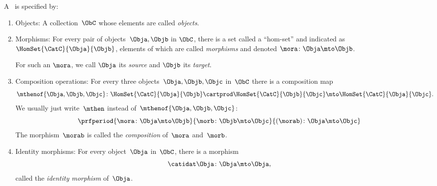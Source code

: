 \begin{ctdefinition}[Category]
    \label{def:categorymain}
    A ~\CatC is specified by:
    \begin{body}
        \constit
        \begin{enumerate}
            \item \label{category-objects}
                  Objects: A collection~$\ObC$ whose elements are called \emph{objects}.
            \item \label{category-morphisms}
                  Morphisms: For every pair of objects~$\Obja,\Objb$ in $\ObC$, there is a set called a ``hom-set'' and indicated as~$\HomSet{\CatC}{\Obja}{\Objb}$, elements of which are called \emph{morphisms} and denoted $\mora \colon \Obja \mto \Objb$.

                  For such an $\mora$, we call $\Obja$ its \emph{source} and $\Objb$ its \emph{target}.
            \item \label{category-composition}
                  Composition operations: For every three objects~$\Obja,\Objb,\Objc$ in~$\ObC$ there is a composition map
                  \begin{equation}\label{eq:category-composition}
                      \mthenof{\Obja,\Objb,\Objc}\colon \HomSet{\CatC}{\Obja}{\Objb} \cartprod \HomSet{\CatC}{\Objb}{\Objc}\mto \HomSet{\CatC}{\Obja}{\Objc}.
                  \end{equation}
                  We usually just write~$\mthen$ instead of~$\mthenof{\Obja,\Objb,\Objc}$:
                  \begin{equation}
                      \prfperiod{
                          \mora \colon \Obja \mto \Objb
                      }{
                          \morb\colon \Objb \mto \Objc
                      }{
                          (\morab )\colon \Obja \mto \Objc
                      }
                  \end{equation}
                  The morphism~$\morab$ is called the \emph{composition} of~$\mora$ and~$\morb$.
            \item \label{category-identities}
                  Identity morphisms: For every object~$\Obja$ in~$\ObC$, there is a morphism
                  \begin{equation}\label{eq:category-identity}
                      \catidat\Obja \colon \Obja \mto \Obja,
                  \end{equation}
                  called the \emph{identity morphism} of~$\Obja$.

\end{enumerate}
\end{body}
\end{ctdefinition}
